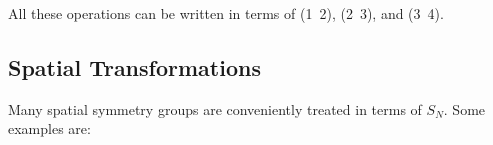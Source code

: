 All these operations can be written in terms of (1~2), (2~3), and (3~4).

\subsection{Spatial Transformations}

Many spatial symmetry groups are conveniently treated in terms of 
$S_N$.  Some examples are:

\begin{figure}
\caption{}
\label{chap16-fig5}
\end{figure}

\begin{figure}
\caption{}
\label{chap16-fig6}
\end{figure}

\begin{figure}
\caption{}
\label{chap16-fig7}
\end{figure}

